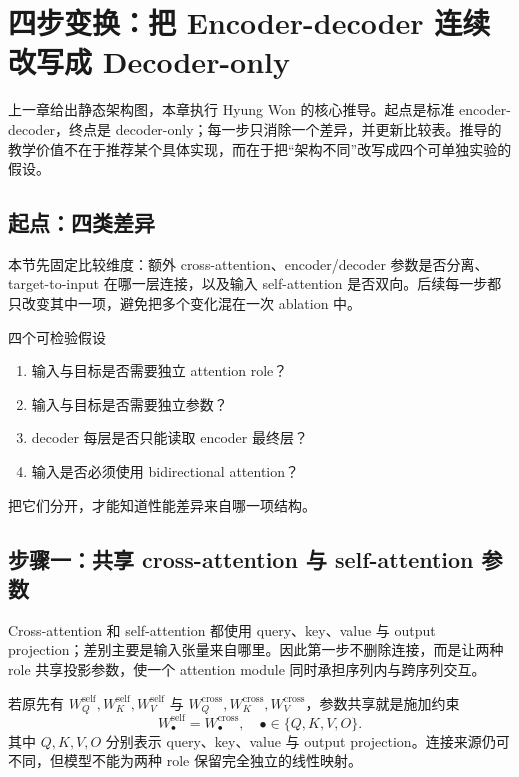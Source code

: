 \section{四步变换：把 Encoder-decoder 连续改写成 Decoder-only}

上一章给出静态架构图，本章执行 Hyung Won 的核心推导。起点是标准 encoder-decoder，终点是 decoder-only；每一步只消除一个差异，并更新比较表。推导的教学价值不在于推荐某个具体实现，而在于把“架构不同”改写成四个可单独实验的假设。

\subsection{起点：四类差异}

本节先固定比较维度：额外 cross-attention、encoder/decoder 参数是否分离、target-to-input 在哪一层连接，以及输入 self-attention 是否双向。后续每一步都只改变其中一项，避免把多个变化混在一次 ablation 中。


\begin{importantbox}{四个可检验假设}
\begin{enumerate}
  \item 输入与目标是否需要独立 attention role？
  \item 输入与目标是否需要独立参数？
  \item decoder 每层是否只能读取 encoder 最终层？
  \item 输入是否必须使用 bidirectional attention？
\end{enumerate}
把它们分开，才能知道性能差异来自哪一项结构。
\end{importantbox}

\subsection{步骤一：共享 cross-attention 与 self-attention 参数}

Cross-attention 和 self-attention 都使用 query、key、value 与 output projection；差别主要是输入张量来自哪里。因此第一步不删除连接，而是让两种 role 共享投影参数，使一个 attention module 同时承担序列内与跨序列交互。


若原先有 $W_Q^{\mathrm{self}},W_K^{\mathrm{self}},W_V^{\mathrm{self}}$ 与 $W_Q^{\mathrm{cross}},W_K^{\mathrm{cross}},W_V^{\mathrm{cross}}$，参数共享就是施加约束
\[
W_{\bullet}^{\mathrm{self}}=W_{\bullet}^{\mathrm{cross}},
\quad \bullet\in\{Q,K,V,O\}.
\]
其中 $Q,K,V,O$ 分别表示 query、key、value 与 output projection。连接来源仍可不同，但模型不能为两种 role 保留完全独立的线性映射。

